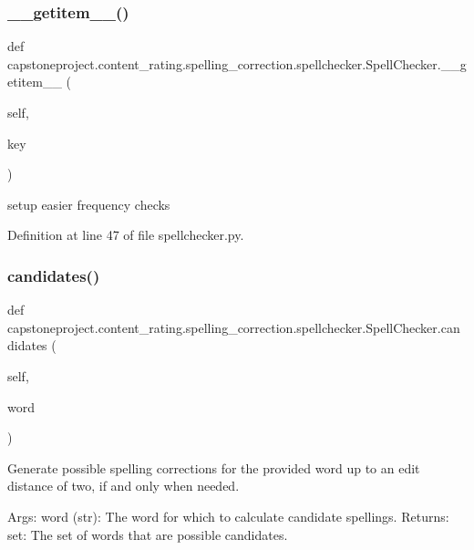 \subsubsection{\texorpdfstring{\+\_\+\+\_\+getitem\+\_\+\+\_\+()}{\_\_getitem\_\_()}}
{\footnotesize\ttfamily def capstoneproject.\+content\+\_\+rating.\+spelling\+\_\+correction.\+spellchecker.\+Spell\+Checker.\+\_\+\+\_\+getitem\+\_\+\+\_\+ (\begin{DoxyParamCaption}\item[{}]{self,  }\item[{}]{key }\end{DoxyParamCaption})}

\begin{DoxyVerb}setup easier frequency checks \end{DoxyVerb}
 

Definition at line 47 of file spellchecker.\+py.

\mbox{\label{classcapstoneproject_1_1content__rating_1_1spelling__correction_1_1spellchecker_1_1_spell_checker_a82729e9d8e408975c17a24832e7fc81c}} 
\subsubsection{\texorpdfstring{candidates()}{candidates()}}
{\footnotesize\ttfamily def capstoneproject.\+content\+\_\+rating.\+spelling\+\_\+correction.\+spellchecker.\+Spell\+Checker.\+candidates (\begin{DoxyParamCaption}\item[{}]{self,  }\item[{}]{word }\end{DoxyParamCaption})}

\begin{DoxyVerb}Generate possible spelling corrections for the provided word up to an edit distance of two, if and
only when needed.

    Args:
word (str): The word for which to calculate candidate spellings.
    Returns:
set: The set of words that are possible candidates.
\end{DoxyVerb}
 

